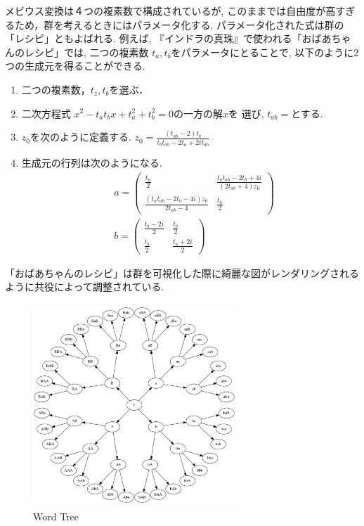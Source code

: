 メビウス変換は４つの複素数で構成されているが, このままでは自由度が高すぎ
るため，群を考えるときにはパラメータ化する.
パラメータ化された式は群の「レシピ」ともよばれる.
例えば, 『インドラの真珠』で使われる「おばあちゃんのレシピ」では, 二つの複素数
$t_a, t_b$をパラメータにとることで, 以下のように2つの生成元を得ることができる.
\begin{enumerate}
 \item 二つの複素数，$t_z, t_b$を選ぶ．
 \item  二次方程式
        $x^2 - t_a t_b x + t_a^2 + t_b^2 = 0 \text{の一方の解}x\text{を
        選び, }t_{ab}= \text{とする. }$
 \item $z_0$を次のように定義する.
       $z_0 = \frac{(t_{ab} -2)t_b}{t_b t_{ab} - 2 t_a + 2it_{ab}}$
 \item 生成元の行列は次のようになる.
        \begin{align*}
       &a = \left(
      \begin{array}{ccc}
       \frac{t_a}{2} & \frac{t_a t_{ab} - 2 t_b + 4i}{(2 t_{ab} + 4)z_0} \\
       \frac{(t_a t_{ab} - 2 t_b -4i)z_0}{2 t_{ab} - 4} & \frac{t_a}{2}
      \end{array}
     \right)\\
 &b = \left(
      \begin{array}{ccc}
       \frac{t_b - 2i}{2} & \frac{t_b}{2} \\
       \frac{t_b}{2} & \frac{t_b + 2i}{2}
      \end{array}
     \right)
        \end{align*}
\end{enumerate}
「おばあちゃんのレシピ」は群を可視化した際に綺麗な図がレンダリングされるように共役によって調整されている.

\begin{figure}[htbp]
 \center
 \includegraphics[width=3in, height=3in, keepaspectratio]{../img/klein/wordTree.pdf}
 \caption{Word Tree}
 \label{fig:wordTree}
\end{figure}

